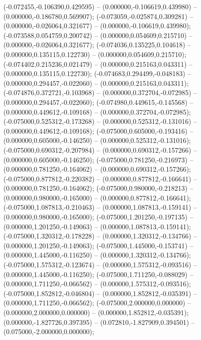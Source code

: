  (-0.072455,-0.106390,0.429595) -- (0.000000,-0.106619,0.439980) -- (0.000000,-0.186780,0.569907);
 (-0.073059,-0.025874,0.309281) -- (0.000000,-0.026064,0.321677) -- (0.000000,-0.106619,0.439980);
 (-0.073588,0.054759,0.200742) -- (0.000000,0.054609,0.215710) -- (0.000000,-0.026064,0.321677);
 (-0.074036,0.135225,0.104618) -- (0.000000,0.135115,0.122730) -- (0.000000,0.054609,0.215710);
 (-0.074402,0.215236,0.021479) -- (0.000000,0.215163,0.043311) -- (0.000000,0.135115,0.122730);
 (-0.074683,0.294499,-0.048183) -- (0.000000,0.294457,-0.022060) -- (0.000000,0.215163,0.043311);
 (-0.074876,0.372721,-0.103968) -- (0.000000,0.372704,-0.072985) -- (0.000000,0.294457,-0.022060);
 (-0.074980,0.449615,-0.145568) -- (0.000000,0.449612,-0.109168) -- (0.000000,0.372704,-0.072985);
 (-0.075000,0.525312,-0.173268) -- (0.000000,0.525312,-0.131016) -- (0.000000,0.449612,-0.109168);
 (-0.075000,0.605000,-0.193416) -- (0.000000,0.605000,-0.146250) -- (0.000000,0.525312,-0.131016);
 (-0.075000,0.690312,-0.207984) -- (0.000000,0.690312,-0.157266) -- (0.000000,0.605000,-0.146250);
 (-0.075000,0.781250,-0.216973) -- (0.000000,0.781250,-0.164062) -- (0.000000,0.690312,-0.157266);
 (-0.075000,0.877812,-0.220382) -- (0.000000,0.877812,-0.166641) -- (0.000000,0.781250,-0.164062);
 (-0.075000,0.980000,-0.218213) -- (0.000000,0.980000,-0.165000) -- (0.000000,0.877812,-0.166641);
 (-0.075000,1.087813,-0.210463) -- (0.000000,1.087813,-0.159141) -- (0.000000,0.980000,-0.165000);
 (-0.075000,1.201250,-0.197135) -- (0.000000,1.201250,-0.149063) -- (0.000000,1.087813,-0.159141);
 (-0.075000,1.320312,-0.178228) -- (0.000000,1.320312,-0.134766) -- (0.000000,1.201250,-0.149063);
 (-0.075000,1.445000,-0.153741) -- (0.000000,1.445000,-0.116250) -- (0.000000,1.320312,-0.134766);
 (-0.075000,1.575312,-0.123674) -- (0.000000,1.575312,-0.093516) -- (0.000000,1.445000,-0.116250);
 (-0.075000,1.711250,-0.088029) -- (0.000000,1.711250,-0.066562) -- (0.000000,1.575312,-0.093516);
 (-0.075000,1.852812,-0.046804) -- (0.000000,1.852812,-0.035391) -- (0.000000,1.711250,-0.066562);
 (-0.075000,2.000000,0.000000) -- (0.000000,2.000000,0.000000) -- (0.000000,1.852812,-0.035391);
 (0.000000,-1.827726,0.397395) -- (0.072810,-1.827909,0.394501) -- (0.075000,-2.000000,0.000000);
